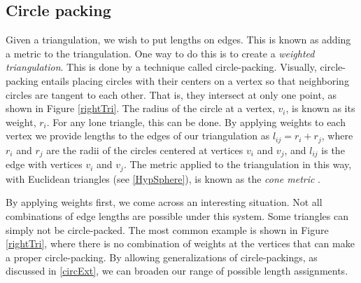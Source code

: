 \documentclass[12pt]{article}
\begin{document}
\subsection{Circle packing}
\maketitle

\noindent Given a triangulation, we wish to put lengths on edges. This is known as adding a metric to the triangulation. One way to do this is to create a \textit{weighted triangulation}. This is done by a technique called circle-packing. Visually, circle-packing entails placing circles with their centers on a vertex so that neighboring circles are tangent to each other. That is, they intersect at only one point, as shown in Figure \ref{rightTri}. The radius of the circle at a vertex, $v_i$, is known as its weight, $r_i$. For any lone triangle, this can be done. By applying weights to each vertex we provide lengths to the edges of our triangulation as $l_{ij}=r_i+r_j$, where $r_i$ and $r_j$ are the radii of the circles centered at vertices $v_i$ and $v_j$, and $l_{ij}$ is the edge with vertices $v_i$ and $v_j$. The metric applied to the triangulation in this way, with Euclidean triangles (see \ref{HypSphere}), is known as the \textit{cone metric} \cite{chowluo}. \newline

\noindent By applying weights first, we come across an interesting situation. Not all combinations of edge lengths are possible under this system. Some triangles can simply not be circle-packed. The most common example is shown in Figure \ref{rightTri}, where there is no combination of weights at the vertices that can make a proper circle-packing. By allowing generalizations of circle-packings, as discussed in \ref{circExt}, we can broaden our range of possible length assignments.
\end{document}
